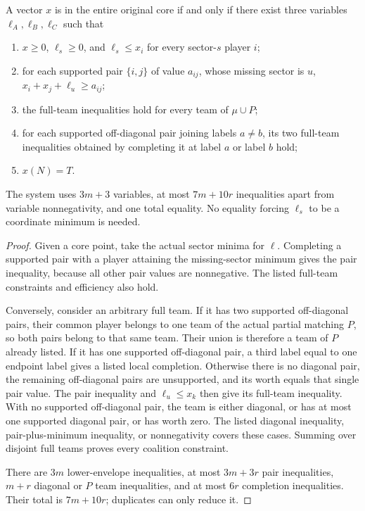 \begin{proposition}\label{anc:compression}
A vector $x$ is in the entire original core if and only if there exist
three variables $\ell_A,\ell_B,\ell_C$ such that
\begin{enumerate}
\item $x\ge0$, $\ell_s\ge0$, and $\ell_s\le x_i$ for every sector-$s$
player $i$;
\item for each supported pair $\{i,j\}$ of value $a_{ij}$, whose missing
sector is $u$, $x_i+x_j+\ell_u\ge a_{ij}$;
\item the full-team inequalities hold for every team of $\mu\cup P$;
\item for each supported off-diagonal pair joining labels $a\ne b$, its
two full-team inequalities obtained by completing it at label $a$ or
label $b$ hold;
\item $x(N)=T$.
\end{enumerate}
The system uses $3m+3$ variables, at most $7m+10r$ inequalities apart
from variable nonnegativity, and one total equality. No equality forcing
$\ell_s$ to be a coordinate minimum is needed.
\end{proposition}
\begin{proof}
Given a core point, take the actual sector minima for $\ell$.
Completing a supported pair with a player attaining the missing-sector
minimum gives the pair inequality, because all other pair values are
nonnegative. The listed full-team constraints and efficiency also hold.

Conversely, consider an arbitrary full team. If it has two supported
off-diagonal pairs, their common player belongs to one team of the
actual partial matching $P$, so both pairs belong to that same team.
Their union is therefore a team of $P$ already listed. If it has one
supported off-diagonal pair, a third label equal to one endpoint label
gives a listed local completion. Otherwise there is no diagonal pair,
the remaining off-diagonal pairs are unsupported, and its worth equals
that single pair value. The pair inequality and $\ell_u\le x_k$
then give its full-team inequality. With no supported off-diagonal
pair, the team is either diagonal, or has at most one supported diagonal
pair, or has worth zero. The listed diagonal inequality, pair-plus-minimum
inequality, or nonnegativity covers these cases. Summing over disjoint
full teams proves every coalition constraint.

There are $3m$ lower-envelope inequalities, at most $3m+3r$ pair
inequalities, $m+r$ diagonal or $P$ team inequalities, and at most
$6r$ completion inequalities. Their total is $7m+10r$; duplicates can
only reduce it.
\end{proof}
